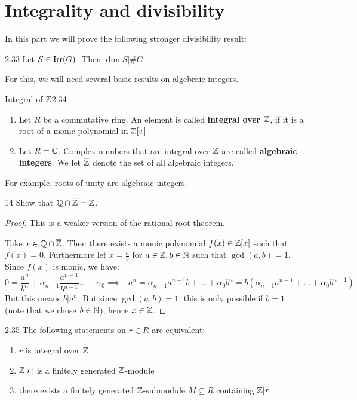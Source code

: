 \documentclass[twoside = false,	%
		headsepline,		%
		parskip = true,
		]{scrbook}						%
\begin{document}
    
\section{Integrality and divisibility}
    In this part we will prove the following stronger divisibility result:
    \begin{proposition}{}{2.33}
        Let $S\in\mathrm{Irr}(G)$. Then $\dim S|\# G$.
    \end{proposition}
    For this, we will need several basic results on algebraic integers.
    \begin{definition}{Integral of $\mathbb Z$}{2.34}
        \begin{enumerate}
            \item Let $R$ be a commutative ring. An element is called \textbf{integral over $\mathbb Z$}, if it is a root of a monic polynomial in $\mathbb Z[x]$
            \item Let $R=\mathbb C$. Complex numbers that are integral over $\mathbb Z$ are called \textbf{algebraic integers}. We let $\overline{\mathbb Z}$ denote the set of all algebraic integers.
        \end{enumerate}
    \end{definition}
    For example, roots of unity are algebraic integers.
    \begin{exercise}{}{14}
        Show that $\mathbb Q\cap\overline{\mathbb Z} = \mathbb Z$.
    \end{exercise}
    \begin{proof}
        This is a weaker version of the rational root theorem.
        
        Take $x \in \mathbb Q \cap \overline{\mathbb Z}$. Then there exists a monic polynomial $f(x) \in \mathbb Z[x]$ such that $f(x) = 0$. Furthermore let $x = \frac{a}{b}$ for $a \in \mathbb Z, b \in \mathbb N$ such that $\gcd(a,b) = 1$. Since $f(x)$ is monic, we have:
        \begin{equation*}
            0 = \frac{a^n}{b^n} + \alpha_{n-1} \frac{a^{n-1}}{b^{n-1}}\dots + \alpha_0 \implies -a^n = \alpha_{n-1} a^{n-1}b + \dots + \alpha_0 b^n = b(\alpha_{n-1} a^{n-1} + \dots + \alpha_0 b^{n-1})
        \end{equation*}
        But this means $b | a^n$. But since $\gcd(a,b) = 1$, this is only possible if $b = 1$ (note that we chose $b \in \mathbb N$), hence $x \in \mathbb Z$.
    \end{proof}
    \begin{lemma}{}{2.35}
        The following statements on $r\in R$ are equivalent:
        \begin{enumerate}
            \item $r$ is integral over $\mathbb Z$
            \item $\mathbb Z[r]$ is a finitely generated $\mathbb Z$-module
            \item there exists a finitely generated $\mathbb Z$-submodule $M\subseteq R$ containing $\mathbb Z[r]$
        \end{enumerate}
    \end{lemma}
\end{document}
